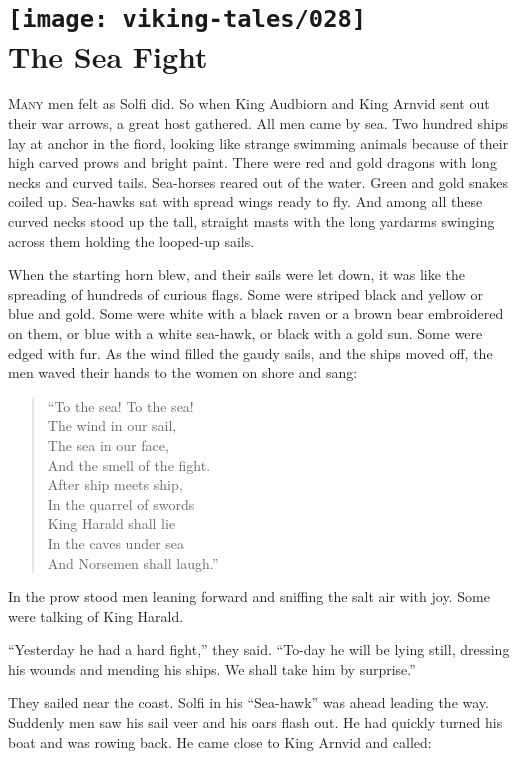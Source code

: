 \chapter[The Sea Fight]{
    \texttt{[image: viking-tales/028]}\\
    The Sea Fight}

\lettrine{M}{any} men felt as Solfi did. So when King Audbiorn and King
Arnvid sent out their war arrows, a great host gathered. All men came by
sea. Two hundred ships lay at anchor in the fiord, looking like strange
swimming animals because of their high carved prows and bright paint.
There were red and gold dragons with long necks and curved tails.
Sea-horses reared out of the water. Green and gold snakes coiled up.
Sea-hawks sat with spread wings ready to fly. And among all these curved
necks stood up the tall, straight masts with the long yardarms swinging
across them holding the looped-up sails.

When the starting horn blew, and their sails were let down, it was like
the spreading of hundreds of curious flags. Some were striped black and
yellow or blue and gold. Some were white with a black raven or a brown
bear embroidered on them, or blue with a white sea-hawk, or black with a
gold sun. Some were edged with fur. As the wind filled the gaudy sails,
and the ships moved off, the men waved their hands to the women on shore
and sang:

\begin{quote}
``To the sea! To the sea!\\
The wind in our sail,\\
The sea in our face,\\
And the smell of the fight.\\
After ship meets ship,\\
In the quarrel of swords\\
King Harald shall lie\\
In the caves under sea\\
And Norsemen shall laugh.''
\end{quote}

In the prow stood men leaning forward and sniffing the salt air with
joy. Some were talking of King Harald.

``Yesterday he had a hard fight,'' they said. ``To-day he will be lying
still, dressing his wounds and mending his ships. We shall take him by
surprise.''

They sailed near the coast. Solfi in his ``Sea-hawk'' was ahead leading
the way. Suddenly men saw his sail veer and his oars flash out. He had
quickly turned his boat and was rowing back. He came close to King
Arnvid and called:

